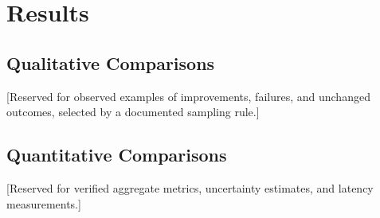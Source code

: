 \section{Results}

\subsection{Qualitative Comparisons}

[Reserved for observed examples of improvements, failures, and unchanged outcomes, selected by a documented sampling rule.]

\subsection{Quantitative Comparisons}

[Reserved for verified aggregate metrics, uncertainty estimates, and latency measurements.]

